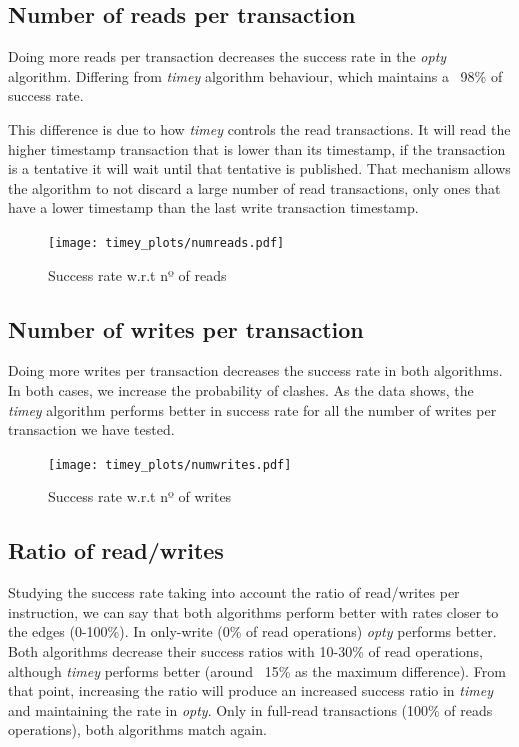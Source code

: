 \documentclass[a4paper, 10pt]{article}
\begin{document}
\clearpage
\subsection{Number of reads per transaction}

Doing more reads per transaction decreases the success rate in the \textit{opty} algorithm. Differing from \textit{timey} algorithm behaviour, which maintains a ~98\% of success rate.

This difference is due to how \textit{timey} controls the read transactions. It will read the higher timestamp transaction that is lower than its timestamp, if the transaction is a tentative it will wait until that tentative is published. That mechanism allows the algorithm to not discard a large number of read transactions, only ones that have a lower timestamp than the last write transaction timestamp.

\begin{figure}[H]
  \centering
  \texttt{[image: timey\_plots/numreads.pdf]}
    \caption{Success rate w.r.t nº of reads}
    \label{timey:numreads}
\end{figure} 

\clearpage
\subsection{Number of writes per transaction}

Doing more writes per transaction decreases the success rate in both algorithms. In both cases, we increase the probability of clashes. As the data shows, the \textit{timey} algorithm performs better in success rate for all the number of writes per transaction we have tested.

\begin{figure}[H]
  \centering
  \texttt{[image: timey\_plots/numwrites.pdf]}
    \caption{Success rate w.r.t nº of writes}
    \label{timey:numwrites}
\end{figure} 

\clearpage
\subsection{Ratio of read/writes}

Studying the success rate taking into account the ratio of read/writes per instruction, we can say that both algorithms perform better with rates closer to the edges (0-100\%). In only-write (0\% of read operations) \textit{opty} performs better. Both algorithms decrease their success ratios with 10-30\% of read operations, although \textit{timey} performs better (around ~15\% as the maximum difference). From that point, increasing the ratio will produce an increased success ratio in \textit{timey} and maintaining the rate in \textit{opty}. Only in full-read transactions (100\% of reads operations), both algorithms match again.
\end{document}
